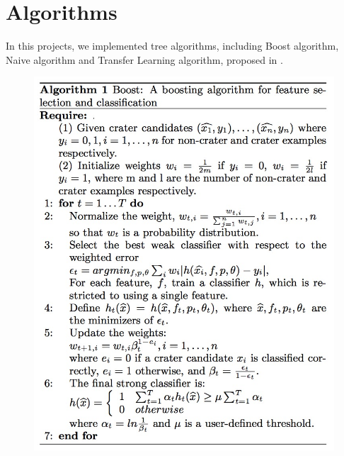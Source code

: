 \documentclass[conference]{IEEEtran}
\begin{document}
\section{Algorithms}
In this projects, we implemented tree algorithms, including Boost algorithm, Naive algorithm and Transfer Learning algorithm, proposed in \cite{ding2011subkilometer}.
\begin{figure}[!h]
\begin{center}
\includegraphics[scale=0.34]{boost.png}
\label{default}
\end{center}
\end{figure}
\end{document}
